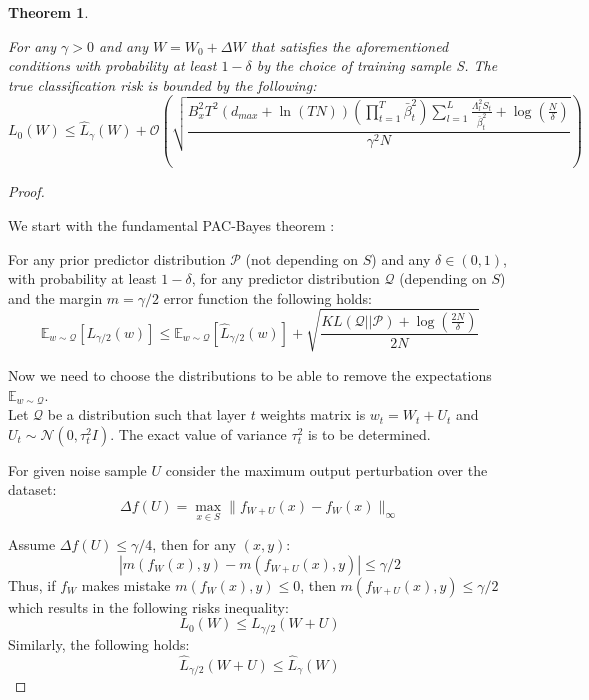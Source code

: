 \documentclass[a4paper,14pt]{extarticle}
\newtheorem{theorem}{Theorem}
\begin{document}
    \begin{theorem}$~$

        For any $\gamma > 0$ and any $W = W_0 + \Delta W$ that satisfies the aforementioned conditions with probability at least $1-\delta$ by the choice of training sample S. The true classification risk is bounded by the following:
        $$ L_0(W) \le \hat{L}_\gamma(W) + \mathcal{O} \left( \sqrt{\frac{ B_x^2 T^2 (d_{max} + \ln(TN)) \left( \prod_{t=1}^T \bar{\beta}_t^2 \right) \sum_{l=1}^L \frac{\Lambda_l^2 S_t}{\bar{\beta}_t^2} + \log\left(\frac{N}{\delta}\right) }{\gamma^2 N}} \right) $$

    \end{theorem}
    
    \begin{proof}$~$

        We start with the fundamental PAC-Bayes theorem \cite{mcallester1999pac}\cite{mcallester2003simplified}:
        
        For any prior predictor distribution $\mathcal{P}$ (not depending on $S$) and any $\delta \in (0,1)$, with probability at least $1-\delta$, for any predictor distribution $\mathcal{Q}$ (depending on $S$) and the margin $m = \gamma/2$ error function the following holds:
        $$ \mathbb{E}_{w \sim \mathcal{Q}}[L_{\gamma/2}(w)] \leqslant \mathbb{E}_{w \sim \mathcal{Q}}[\hat{L}_{\gamma/2}(w)] + \sqrt{\frac{KL(\mathcal{Q} || \mathcal{P}) + \log\left(\frac{2N}{\delta}\right)}{2N}} $$

        Now we need to choose the distributions to be able to remove the expectations $\mathbb{E}_{w \sim \mathcal{Q}}$.\\
        
        Let $\mathcal{Q}$ be a distribution such that layer $t$ weights matrix is $w_t = W_t + U_t$ and $U_t\sim \mathcal{N}(0, \tau_t^2 I)$. The exact value of variance $\tau_t^2$ is to be determined.

        For given noise sample $U$ consider the maximum output perturbation over the dataset:
        $$ \Delta f(U) = \max_{x \in S} \|f_{W+U}(x) - f_W(x)\|_\infty $$

        Assume $\Delta f(U) \le \gamma / 4$, then for any $(x, y)$:
        $$|m(f_W(x), y) - m(f_{W+U}(x), y)| \leqslant \gamma/2$$
        Thus, if $f_W$ makes mistake $m(f_W(x), y) \leqslant 0$, then $m(f_{W+U}(x), y)\leqslant \gamma / 2$ which results in the following risks inequality:
        $$L_0(W) \leqslant L_{\gamma/2}(W+U)$$
        Similarly, the following holds:
        $$\widehat{L}_{\gamma/2}(W+U) \leqslant \widehat{L}_\gamma(W)$$
        

\end{proof}
\end{document}
